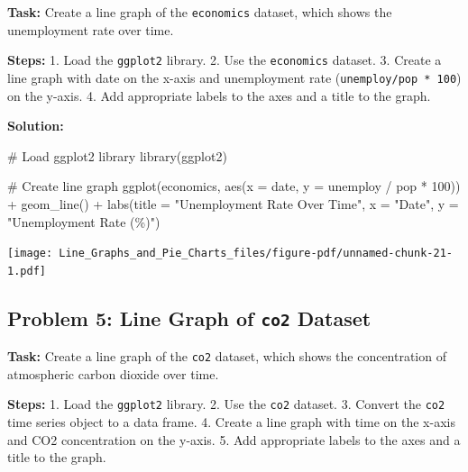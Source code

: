 \documentclass[
  letterpaper,
  DIV=11,
  numbers=noendperiod]{scrreprt}
\newenvironment{Shaded}{\begin{snugshade}}{\end{snugshade}}
\newcommand{\AttributeTok}[1]{\textcolor[rgb]{0.40,0.45,0.13}{#1}}
\newcommand{\CommentTok}[1]{\textcolor[rgb]{0.37,0.37,0.37}{#1}}
\newcommand{\DecValTok}[1]{\textcolor[rgb]{0.68,0.00,0.00}{#1}}
\newcommand{\FunctionTok}[1]{\textcolor[rgb]{0.28,0.35,0.67}{#1}}
\newcommand{\NormalTok}[1]{\textcolor[rgb]{0.00,0.23,0.31}{#1}}
\newcommand{\SpecialCharTok}[1]{\textcolor[rgb]{0.37,0.37,0.37}{#1}}
\newcommand{\StringTok}[1]{\textcolor[rgb]{0.13,0.47,0.30}{#1}}
\begin{document}
\textbf{Task:} Create a line graph of the \texttt{economics} dataset,
which shows the unemployment rate over time.

\textbf{Steps:} 1. Load the \texttt{ggplot2} library. 2. Use the
\texttt{economics} dataset. 3. Create a line graph with date on the
x-axis and unemployment rate (\texttt{unemploy/pop\ *\ 100}) on the
y-axis. 4. Add appropriate labels to the axes and a title to the graph.

\textbf{Solution:}

\begin{Shaded}
\begin{Highlighting}[]
\CommentTok{\# Load ggplot2 library}
\FunctionTok{library}\NormalTok{(ggplot2)}

\CommentTok{\# Create line graph}
\FunctionTok{ggplot}\NormalTok{(economics, }\FunctionTok{aes}\NormalTok{(}\AttributeTok{x =}\NormalTok{ date, }\AttributeTok{y =}\NormalTok{ unemploy }\SpecialCharTok{/}\NormalTok{ pop }\SpecialCharTok{*} \DecValTok{100}\NormalTok{)) }\SpecialCharTok{+}
  \FunctionTok{geom\_line}\NormalTok{() }\SpecialCharTok{+}
  \FunctionTok{labs}\NormalTok{(}\AttributeTok{title =} \StringTok{"Unemployment Rate Over Time"}\NormalTok{,}
       \AttributeTok{x =} \StringTok{"Date"}\NormalTok{,}
       \AttributeTok{y =} \StringTok{"Unemployment Rate (\%)"}\NormalTok{)}
\end{Highlighting}
\end{Shaded}

\texttt{[image: Line\_Graphs\_and\_Pie\_Charts\_files/figure-pdf/unnamed-chunk-21-1.pdf]}

\subsection*{\texorpdfstring{Problem 5: Line Graph of \texttt{co2}
Dataset}{Problem 5: Line Graph of co2 Dataset}}\label{problem-5-line-graph-of-co2-dataset}

\textbf{Task:} Create a line graph of the \texttt{co2} dataset, which
shows the concentration of atmospheric carbon dioxide over time.

\textbf{Steps:} 1. Load the \texttt{ggplot2} library. 2. Use the
\texttt{co2} dataset. 3. Convert the \texttt{co2} time series object to
a data frame. 4. Create a line graph with time on the x-axis and CO2
concentration on the y-axis. 5. Add appropriate labels to the axes and a
title to the graph.
\end{document}
